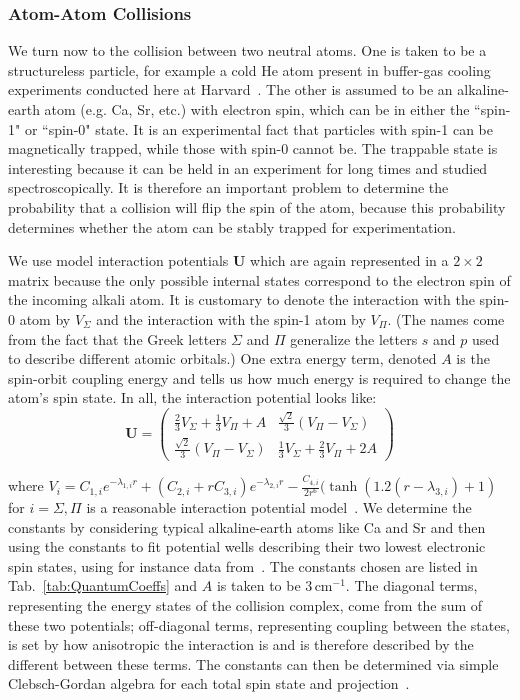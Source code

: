 \documentclass[%
 reprint,
 amsmath,amssymb,
 aps,
 nofootinbib
]{revtex4-1}
\begin{document}
\subsubsection{Atom-Atom Collisions}
We turn now to the collision between two neutral atoms. One is taken to be a structureless particle, for example a cold He atom present in buffer-gas cooling experiments conducted here at Harvard~\cite{Connolly2013,Tscherbul2010}. The other is assumed to be an alkaline-earth atom (e.g. Ca, Sr, etc.) with electron spin, which can be in either the ``spin-1" or ``spin-0" state. It is an experimental fact that particles with spin-1 can be magnetically trapped, while those with spin-0 cannot be. The trappable state is interesting because it can be held in an experiment for long times and studied spectroscopically. It is therefore an important problem to determine the probability that a collision will flip the spin of the atom, because this probability determines whether the atom can be stably trapped for experimentation. 

We use model interaction potentials $\mathbf{U}$ which are again represented in a $2 \times 2$ matrix because the only possible internal states correspond to the electron spin of the incoming alkali atom. It is customary to denote the interaction with the spin-0 atom by $V_\Sigma$ and the interaction with the spin-1 atom by $V_\Pi$. (The names come from the fact that the Greek letters $\Sigma$ and $\Pi$ generalize the letters $s$ and $p$ used to describe different atomic orbitals.) One extra energy term, denoted $A$ is the spin-orbit coupling energy and tells us how much energy is required to change the atom's spin state. In all, the interaction potential looks like:
\begin{equation}
\mathbf{U} = \left( \begin{array}{cc}
\frac{2}{3} V_\Sigma + \frac{1}{3} V_\Pi + A & \frac{\sqrt{2}}{3}(V_\Pi - V_\Sigma) \\
 \frac{\sqrt{2}}{3}(V_\Pi - V_\Sigma) & \frac{1}{3} V_\Sigma + \frac{2}{3} V_\Pi + 2A
\end{array} \right)
\end{equation}

\noindent where $V_i = C_{1,i} e^{-\lambda_{1,i} r} + (C_{2,i} + r C_{3,i}) e^{-\lambda_{2,i} r} - \frac{C_{4,i}}{2r^6}(\tanh( 1.2(r-\lambda_{3,i})+1)$ for $i = \Sigma, \Pi$ is a reasonable interaction potential model~\cite{Krems2017,Tscherbul2010,ColdChemBook}. We determine the constants by considering typical alkaline-earth atoms like Ca and Sr and then using the constants to fit potential wells describing their two lowest electronic spin states, using for instance data from~\cite{AlexanderNotes}. The constants chosen are listed in Tab.~\ref{tab:QuantumCoeffs} and $A$ is taken to be $3 \, \text{cm}^{-1}$. The diagonal terms, representing the energy states of the collision complex, come from the sum of these two potentials; off-diagonal terms, representing coupling between the states, is set by how anisotropic the interaction is and is therefore described by the different between these terms. The constants can then be determined via simple Clebsch-Gordan algebra for each total spin state and projection~\cite{Tscherbul2010,Connolloy2010}.
\end{document}
